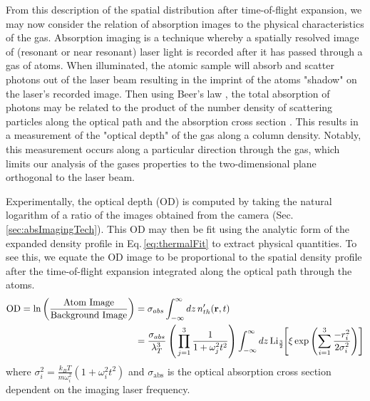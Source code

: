 From this description of the spatial distribution after time-of-flight expansion, we may now consider the relation of absorption images to the physical characteristics of the gas.
Absorption imaging is a technique whereby a spatially resolved image of (resonant or near resonant) laser light is recorded after it has passed through a gas of atoms.
When illuminated, the atomic sample will absorb and scatter photons out of the laser beam resulting in the imprint of the atoms "shadow" on the laser's recorded image.
Then using Beer's law \cite{Foot2005, Hueck2017, Reinaudi2007}, the total absorption of photons may be related to the product of the number density of scattering particles along the optical path and the absorption cross section \cite{Mickelson2010b}. 
This results in a measurement of the "optical depth" of the gas along a column density. 
Notably, this measurement occurs along a particular direction through the gas, which limits our analysis of the gases properties to the two-dimensional plane orthogonal to the laser beam.

Experimentally, the optical depth (OD) is computed by taking the natural logarithm of a ratio of the images obtained from the camera (Sec.\,\ref{sec:absImagingTech}).
This OD may then be fit using the analytic form of the expanded density profile in Eq.\,\ref{eq:thermalFit} to extract physical quantities.
To see this, we equate the OD image to be proportional to the spatial density profile after the time-of-flight expansion integrated along the optical path through the atoms.
\begin{equation} \label{eq:polyLogExp}
\begin{split}
	\text{OD} = \text{ln} \left( \frac{\text{Atom Image}}{\text{Background Image}} \right) &= \sigma_{abs} \int_{-\infty}^{\infty} dz \, n_{th}'(\mathbf{r},t) \\ 
&= \frac{\sigma_{abs}}{\lambda_T^3} \left( \, \prod_{j=1}^3 \frac{1}{1+\omega_j^2t^2}\right) \int_{-\infty}^{\infty} dz\,\text{Li}_{\scriptscriptstyle\frac{3}{2}\!}\!\left[ \xi \,\text{exp}\left( {\sum_{i=1}^3 \frac{-r_i^2}{2\sigma_i^2}} \right) \right]
\end{split}
\end{equation}
where $\sigma_i^2 = \frac{k_BT}{m\omega_i^2}(1+\omega_i^2t^2)$ and $\sigma_{\text{abs}}$ is the optical absorption cross section dependent on the imaging laser frequency.

